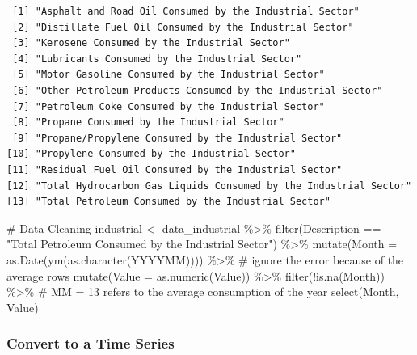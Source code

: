 \documentclass[
  letterpaper,
  DIV=11,
  numbers=noendperiod]{scrartcl}
\newenvironment{Shaded}{\begin{snugshade}}{\end{snugshade}}
\newcommand{\AttributeTok}[1]{\textcolor[rgb]{0.40,0.45,0.13}{#1}}
\newcommand{\CommentTok}[1]{\textcolor[rgb]{0.37,0.37,0.37}{#1}}
\newcommand{\FunctionTok}[1]{\textcolor[rgb]{0.28,0.35,0.67}{#1}}
\newcommand{\NormalTok}[1]{\textcolor[rgb]{0.00,0.23,0.31}{#1}}
\newcommand{\OtherTok}[1]{\textcolor[rgb]{0.00,0.23,0.31}{#1}}
\newcommand{\SpecialCharTok}[1]{\textcolor[rgb]{0.37,0.37,0.37}{#1}}
\newcommand{\StringTok}[1]{\textcolor[rgb]{0.13,0.47,0.30}{#1}}
\begin{document}
\begin{verbatim}
 [1] "Asphalt and Road Oil Consumed by the Industrial Sector"         
 [2] "Distillate Fuel Oil Consumed by the Industrial Sector"          
 [3] "Kerosene Consumed by the Industrial Sector"                     
 [4] "Lubricants Consumed by the Industrial Sector"                   
 [5] "Motor Gasoline Consumed by the Industrial Sector"               
 [6] "Other Petroleum Products Consumed by the Industrial Sector"     
 [7] "Petroleum Coke Consumed by the Industrial Sector"               
 [8] "Propane Consumed by the Industrial Sector"                      
 [9] "Propane/Propylene Consumed by the Industrial Sector"            
[10] "Propylene Consumed by the Industrial Sector"                    
[11] "Residual Fuel Oil Consumed by the Industrial Sector"            
[12] "Total Hydrocarbon Gas Liquids Consumed by the Industrial Sector"
[13] "Total Petroleum Consumed by the Industrial Sector"              
\end{verbatim}

\begin{Shaded}
\begin{Highlighting}[]
\CommentTok{\# Data Cleaning}
\NormalTok{industrial }\OtherTok{\textless{}{-}}\NormalTok{ data\_industrial }\SpecialCharTok{\%\textgreater{}\%}
  \FunctionTok{filter}\NormalTok{(Description }\SpecialCharTok{==} \StringTok{"Total Petroleum Consumed by the Industrial Sector"}\NormalTok{) }\SpecialCharTok{\%\textgreater{}\%} 
  \FunctionTok{mutate}\NormalTok{(}\AttributeTok{Month =} \FunctionTok{as.Date}\NormalTok{(}\FunctionTok{ym}\NormalTok{(}\FunctionTok{as.character}\NormalTok{(YYYYMM)))) }\SpecialCharTok{\%\textgreater{}\%} \CommentTok{\# ignore the error because of the average rows}
  \FunctionTok{mutate}\NormalTok{(}\AttributeTok{Value =} \FunctionTok{as.numeric}\NormalTok{(Value)) }\SpecialCharTok{\%\textgreater{}\%}
  \FunctionTok{filter}\NormalTok{(}\SpecialCharTok{!}\FunctionTok{is.na}\NormalTok{(Month)) }\SpecialCharTok{\%\textgreater{}\%} \CommentTok{\# MM = 13 refers to the average consumption of the year}
  \FunctionTok{select}\NormalTok{(Month, Value)}
\end{Highlighting}
\end{Shaded}

\subsubsection{Convert to a Time Series}\label{convert-to-a-time-series}
\end{document}
